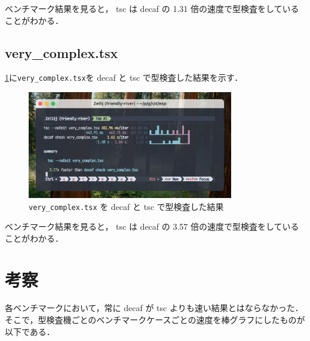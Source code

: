 ベンチマーク結果を見ると， tsc は decaf の 1.31 倍の速度で型検査をしていることがわかる．

\subsection{very\_complex.tsx}

\ref{fig:very_complex}に\texttt{very\_complex.tsx}を decaf と tsc で型検査した結果を示す．

\begin{figure}[H]
    \centering
    \includegraphics[width=0.8\textwidth]{figures/fig_exp_1_very_complex_tsx.png}
    \caption{\texttt{very\_complex.tsx} を decaf と tsc で型検査した結果}
    \label{fig:very_complex}
\end{figure}

ベンチマーク結果を見ると， tsc は decaf の 3.57 倍の速度で型検査をしていることがわかる．

\section{考察}

各ベンチマークにおいて，常に decaf が tsc よりも速い結果とはならなかった．
そこで，型検査機ごとのベンチマークケースごとの速度を棒グラフにしたものが以下である．

